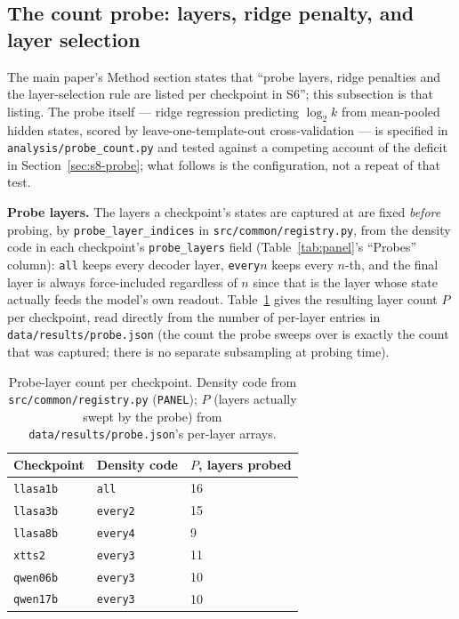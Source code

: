 \documentclass[11pt]{article}
\begin{document}
\subsection{The count probe: layers, ridge penalty, and layer selection}
\label{sec:s6-probe}

The main paper's Method section states that ``probe layers, ridge penalties
and the layer-selection rule are listed per checkpoint in S6''; this
subsection is that listing. The probe itself --- ridge regression predicting
$\log_2 k$ from mean-pooled hidden states, scored by leave-one-template-out
cross-validation --- is specified in \texttt{analysis/probe\_count.py} and
tested against a competing account of the deficit in
Section~\ref{sec:s8-probe}; what follows is the configuration, not a repeat of
that test.

\noindent\textbf{Probe layers.} The layers a checkpoint's states are captured
at are fixed \emph{before} probing, by \texttt{probe\_layer\_indices} in
\texttt{src/common/registry.py}, from the density code in each checkpoint's
\texttt{probe\_layers} field (Table~\ref{tab:panel}'s ``Probes'' column):
\texttt{all} keeps every decoder layer, \texttt{every}$n$ keeps every $n$-th,
and the final layer is always force-included regardless of $n$ since that is
the layer whose state actually feeds the model's own readout. Table~\ref{tab:probe-layers}
gives the resulting layer count $P$ per checkpoint, read directly from the
number of per-layer entries in \texttt{data/results/probe.json} (the count the
probe sweeps over is exactly the count that was captured; there is no separate
subsampling at probing time).

\begin{table}[h]
\centering
\caption{Probe-layer count per checkpoint. Density code from
\texttt{src/common/registry.py} (\texttt{PANEL}); $P$ (layers actually swept
by the probe) from \texttt{data/results/probe.json}'s per-layer arrays.}
\label{tab:probe-layers}
\small
\begin{tabular}{@{}lll@{}}
\toprule
Checkpoint & Density code & $P$, layers probed \\
\midrule
\texttt{llasa1b} & \texttt{all} & 16 \\
\texttt{llasa3b} & \texttt{every2} & 15 \\
\texttt{llasa8b} & \texttt{every4} & 9 \\
\texttt{xtts2} & \texttt{every3} & 11 \\
\texttt{qwen06b} & \texttt{every3} & 10 \\
\texttt{qwen17b} & \texttt{every3} & 10 \\
\bottomrule
\end{tabular}
\end{table}
\end{document}
